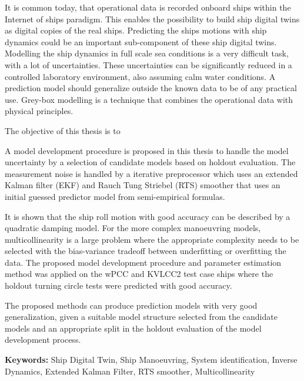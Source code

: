 
It is common today, that operational data is recorded onboard ships within the Internet of ships paradigm. This enables the possibility to build ship digital twins as digital copies of the real ships. Predicting the ships motions with ship dynamics could be an important sub-component of these ship digital twins. Modelling the ship dynamics in full scale sea conditions is a very difficult task, with a lot of uncertainties. These uncertainties can be significantly reduced in a controlled laboratory environment, also assuming calm water conditions. A prediction model should generalize outside the known data to be of any practical use. Grey-box modelling is a technique that combines the operational data with physical principles.  

The objective of this thesis is to 
\noindent \objective 

A model development procedure is proposed in this thesis to handle the model uncertainty by a selection of candidate models based on holdout evaluation. The measurement noise is handled by a iterative preprocessor which uses an extended Kalman filter (EKF) and Rauch Tung Striebel (RTS) smoother that uses an initial guessed predictor model from semi-empirical formulas.

It is shown that the ship roll motion with good accuracy can be described by a quadratic damping model. For the more complex manoeuvring models, multicollinearity is a large problem where the appropriate complexity needs to be selected with the bias-variance tradeoff between underfitting or overfitting the data. 
The proposed model development procedure and parameter estimation method was applied on the wPCC and KVLCC2 test case ships where the holdout turning circle tests were predicted with good accuracy.

The proposed methods can produce prediction models with very good generalization, given a suitable model structure selected from the candidate models and an appropriate split in the holdout evaluation of the model development process. 

\vspace{0.1cm}
\textbf{Keywords:} Ship Digital Twin, Ship Manoeuvring, System identification, Inverse Dynamics, Extended Kalman Filter, RTS smoother, Multicollinearity
